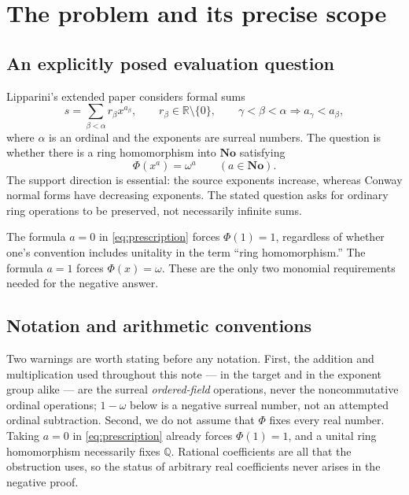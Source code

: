 \documentclass[11pt,letterpaper]{article}
\theoremstyle{definition}
\theoremstyle{remark}
\newcommand{\No}{\mathbf{No}}
\newcommand{\R}{\mathbb R}
\newcommand{\Q}{\mathbb Q}
\begin{document}
\section{The problem and its precise scope}\label{sec:problem}

\subsection{An explicitly posed evaluation question}
Lipparini's extended paper \citep[Problem 7.7, p.~38]{Lipparini2026} considers
formal sums
\begin{equation}\label{eq:source}
 s=\sum_{\beta<\alpha} r_\beta x^{a_\beta},
 \qquad r_\beta\in\R\setminus\{0\},
 \qquad \gamma<\beta<\alpha\Longrightarrow a_\gamma<a_\beta,
\end{equation}
where $\alpha$ is an ordinal and the exponents are surreal numbers. The question
is whether there is a ring homomorphism into $\No$ satisfying
\begin{equation}\label{eq:prescription}
 \Phi(x^a)=\omega^a\qquad(a\in\No).
\end{equation}
The support direction is essential: the source exponents increase, whereas
Conway normal forms have decreasing exponents. The stated question asks for
ordinary ring operations to be preserved, not necessarily infinite sums.

The formula $a=0$ in \eqref{eq:prescription} forces $\Phi(1)=1$, regardless of
whether one's convention includes unitality in the term ``ring homomorphism.''
The formula $a=1$ forces $\Phi(x)=\omega$. These are the only two monomial
requirements needed for the negative answer.

\subsection{Notation and arithmetic conventions}
Two warnings are worth stating before any notation. First, the addition and
multiplication used throughout this note --- in the target and in the exponent
group alike --- are the surreal \emph{ordered-field} operations, never the
noncommutative ordinal operations; $1-\omega$ below is a negative surreal
number, not an attempted ordinal subtraction. Second, we do not assume that
$\Phi$ fixes every real number. Taking $a=0$ in \eqref{eq:prescription}
already forces $\Phi(1)=1$, and a unital ring homomorphism necessarily fixes
$\Q$. Rational coefficients are all that the obstruction uses, so the status
of arbitrary real coefficients never arises in the negative proof.
\end{document}
